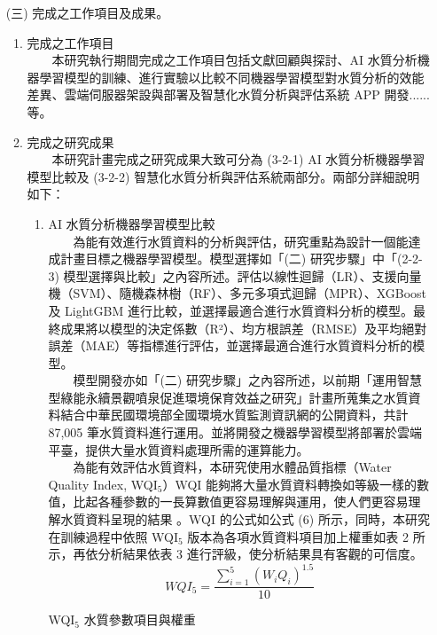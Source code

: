 \documentclass[12pt,a4paper]{article}
\begin{document}
\begin{enumerate}
\item[(三)] 完成之工作項目及成果。
\begin{enumerate}[label=\arabic*.]
\item 完成之工作項目\\
　　本研究執行期間完成之工作項目包括文獻回顧與探討、AI 水質分析機器學習模型的訓練、進行實驗以比較不同機器學習模型對水質分析的效能差異、雲端伺服器架設與部署及智慧化水質分析與評估系統 APP 開發......等。
\item 完成之研究成果\\
　　本研究計畫完成之研究成果大致可分為 (3-2-1) AI 水質分析機器學習模型比較及 (3-2-2) 智慧化水質分析與評估系統兩部分。兩部分詳細說明如下：
    \begin{enumerate}[label=3-2-\arabic*.]
        \item AI 水質分析機器學習模型比較\\
        　　為能有效進行水質資料的分析與評估，研究重點為設計一個能達成計畫目標之機器學習模型。模型選擇如「(二) 研究步驟」中「(2-2-3) 模型選擇與比較」之內容所述。評估以線性迴歸（LR）、支援向量機（SVM）、隨機森林樹（RF）、多元多項式迴歸（MPR）、XGBoost 及 LightGBM 進行比較，並選擇最適合進行水質資料分析的模型。最終成果將以模型的決定係數（R²）、均方根誤差（RMSE）及平均絕對誤差（MAE）等指標進行評估，並選擇最適合進行水質資料分析的模型。\\
        　　模型開發亦如「(二) 研究步驟」之內容所述，以前期「運用智慧型綠能永續景觀噴泉促進環境保育效益之研究」計畫所蒐集之水質資料結合中華民國環境部全國環境水質監測資訊網的公開資料，共計 87,005 筆水質資料進行運用。並將開發之機器學習模型將部署於雲端平臺，提供大量水質資料處理所需的運算能力。\\
        　　為能有效評估水質資料，本研究使用水體品質指標（Water Quality Index, WQI$_5$）WQI 能夠將大量水質資料轉換如等級一樣的數值，比起各種參數的一長算數值更容易理解與運用，使人們更容易理解水質資料呈現的結果 \cite{ref35}。WQI 的公式如公式 (6) 所示，同時，本研究在訓練過程中依照 WQI$_5$ 版本為各項水質資料項目加上權重如表 2 所示，再依分析結果依表 3 進行評級，使分析結果具有客觀的可信度。\\
        \begin{equation}
            WQI_5 = \frac{\sum_{i=1}^5 (W_i Q_i)^{1.5}}{10}
        \end{equation}
            \begin{table}[H]
                \centering
                \begin{minipage}{0.45\textwidth}
                    \centering
                    \caption{WQI$_5$ 水質參數項目與權重}

\end{minipage}
\end{table}
\end{enumerate}
\end{enumerate}
\end{enumerate}
\end{document}
